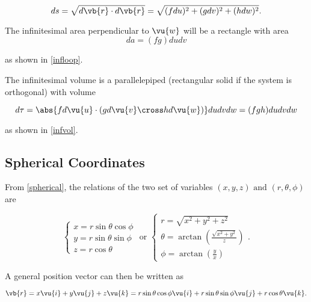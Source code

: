 \documentclass[english,a4paper,12pt]{report}
\begin{document}
\begin{equation}
    ds = \sqrt{d \vb{r} \cdot d \vb{r} } = \sqrt{(fdu)^2 + (gdv)^2 + (hdw)^2}.  
\end{equation}



The infinitesimal area perpendicular to \(\vu{w}\) will be a rectangle with area
\begin{equation}
	da = (fg)dudv \label{da}
\end{equation} 

as shown in \cref{infloop}.

	
The infinitesimal volume is a parallelepiped (rectangular solid if the system is orthogonal) with volume

\begin{equation}
    d \tau = \abs{fd \vu{u} \cdot (gd \vu{v} \cross hd \vu{w} )}dudvdw = (fgh)dudvdw 
\end{equation}

as shown in \cref{infvol}. 

	
\subsection{Spherical Coordinates}


From \cref{spherical}, the relations of the two set of variables \((x,y,z) \text { and } (r,\theta ,\phi  )\)  are

\begin{equation}
    \begin{cases} x = r\sin \theta \cos \phi \\ y = r\sin \theta \sin \phi \\ z = r\cos \theta \end{cases} \text { or } \begin{cases} r = \sqrt{x^2+y^2+z^2} \\ \displaystyle \theta = \arctan {\left(\frac{\sqrt{x^2+y^2} }{z} \right)} \\ \displaystyle \phi = \arctan {\left(\frac{y}{x}\right)} \end{cases}. 
\end{equation}

A general position vector can then be written as 

\begin{equation}
    \vb{r} = x \vu{i} + y \vu{j} + z \vu{k} = r\sin \theta \cos \phi \vu{i} + r\sin \theta \sin \phi \vu{j} + r \cos \theta \vu{k} .
\end{equation}
\end{document}
